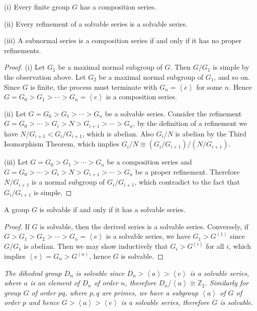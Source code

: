 \begin{theorem}
(i) Every finite group $G$ has a composition series.\par
(ii) Every refinement of a solvable series is a solvable series.\par
(iii) A subnormal series is a composition series if and only if it has no proper refinements.
\end{theorem}
\begin{proof}
(i) Let $G_1$ be a maximal normal subgroup of $G$. Then $G/G_1$ is simple by the observation above. Let $G_2$ be a maximal normal subgroup of $G_1$, and so on. Since $G$ is finite, the process must terminate with $G_n=\left<e\right>$ for some $n$. Hence $G=G_0>G_1>\cdots>G_n=\left<e\right>$ is a composition series.\par
(ii) Let $G=G_0>G_1>\cdots>G_n$ be a solvable series. Consider the refinement $G=G_0>\cdots>G_i>N>G_{i+1}>\cdots>G_n$, by the definition of a refinement we have $N/G_{i+1}<G_i/G_{i+1}$, which is abelian. Also $G_i/N$ is abelian by the Third Isomorphism Theorem, which implies $G_i/N\cong \left( G_i/G_{i+1} \right) /\left( N/G_{i+1} \right) $.\par
(iii) Let $G=G_0>G_1>\cdots>G_n$ be a composition series and $G=G_0>\cdots>G_i>N>G_{i+1}>\cdots>G_n$ be a proper refinement. Therefore $N/G_{i+1}$ is a normal subgroup of $G_i/G_{i+1}$, which contradict to the fact that $G_i/G_{i+1}$ is simple.
\end{proof}
\begin{theorem}
A group $G$ is solvable if and only if it has a solvable series.
\end{theorem}
\begin{proof}
If $G$ is solvable, then the derived series is a solvable series. Conversely, if $G>G_1>G_2>\cdots >G_n=\left< e \right> $ is a solvable series, we have $G_1>G^{(1)}$ since $G/G_1$ is abelian. Then we may show inductively that $G_i>G^{(i)}$ for all $i$, which implies $\left< e \right> =G_n>G^{\left( n \right)}$, hence $G$ is solvable.
\end{proof}
\begin{example}\em
The dihedral group $D_n$ is solvable since $D_n>\left<a\right>>\left<e\right>$ is a solvable series, where $a$ is an element of $D_n$ of order $n$, therefore $D_n/\left<a\right>\cong\mathbb{Z}_2$. Similarly for group $G$ of order $pq$, where $p,q$ are primes, we have a subgroup $\left<a\right>$ of $G$ of order $p$ and hence $G>\left<a\right>>\left<e\right>$ is a solvable series, therefore $G$ is solvable.
\end{example}

